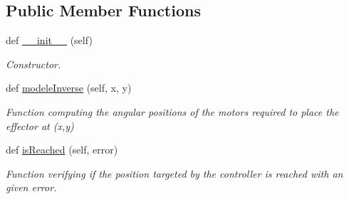 \subsection*{Public Member Functions}
\begin{DoxyCompactItemize}
\item 
def \hyperlink{classwakanda_1_1Wakanda_a27ff7fb9ac3819931b93481588fb1e9f}{\+\_\+\+\_\+init\+\_\+\+\_\+} (self)\hypertarget{classwakanda_1_1Wakanda_a27ff7fb9ac3819931b93481588fb1e9f}{}\label{classwakanda_1_1Wakanda_a27ff7fb9ac3819931b93481588fb1e9f}

\begin{DoxyCompactList}\small\item\em Constructor. \end{DoxyCompactList}\item 
def \hyperlink{classwakanda_1_1Wakanda_a2240de179408dbc71c6892200cf5db1e}{modele\+Inverse} (self, x, y)
\begin{DoxyCompactList}\small\item\em Function computing the angular positions of the motors required to place the effector at (x,y) \end{DoxyCompactList}\item 
def \hyperlink{classwakanda_1_1Wakanda_a483ae1156569ce4c833611e5c688ed81}{is\+Reached} (self, error)
\begin{DoxyCompactList}\small\item\em Function verifying if the position targeted by the controller is reached with an given error. \end{DoxyCompactList}\end{DoxyCompactItemize}

